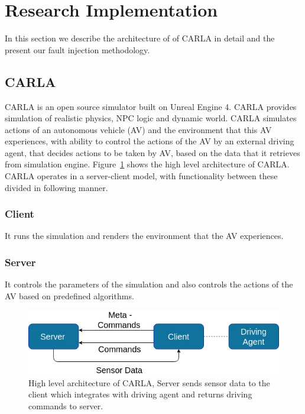 \section{Research Implementation} 
In this section we describe the architecture of of CARLA in detail and the present our fault injection methodology. 

\subsection{CARLA} \label{ri-carla}
CARLA is an open source simulator built on Unreal Engine 4. CARLA provides simulation of realistic physics, NPC logic and dynamic world. CARLA simulates actions of an autonomous vehicle (AV) and the environment that this AV experiences, with ability to control the actions of the AV by an external driving agent,  that decides actions to be taken by AV, based on the data that it retrieves from simulation engine. Figure~\ref{fig:carla_arch} shows the high level architecture of CARLA. CARLA operates in a server-client model, with functionality between these divided in following manner.

\subsubsection{Client} It runs the simulation and renders the environment that the AV experiences.

\subsubsection{Server} It controls the parameters of the simulation and also controls the actions of the AV based on predefined algorithms. 

\begin{figure}  [h]
	\vspace{-0.5em}
	\centering
	\includegraphics[scale=0.4]{CARLA_block}
	\vspace{-0.5em}
	\caption{High level architecture of CARLA, Server sends sensor data to the client which integrates with driving agent and returns driving commands to server.}
	\label{fig:carla_arch}
	\vspace{-1.5em}
\end{figure}

